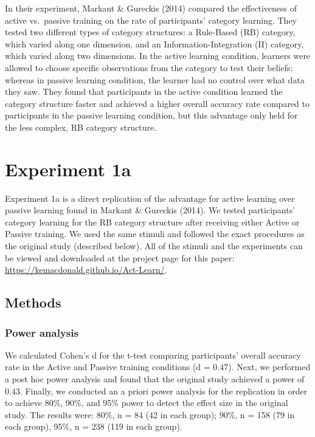 \documentclass[10pt, letterpaper]{article}
\begin{document}
In their experiment, Markant \& Gureckis (2014) compared the
effectiveness of active vs.~passive training on the rate of
participants' category learning. They tested two different types of
category structures: a Rule-Based (RB) category, which varied along one
dimension, and an Information-Integration (II) category, which varied
along two dimensions. In the active learning condition, learners were
allowed to choose specific observations from the category to test their
beliefs; whereas in passive learning condition, the learner had no
control over what data they saw. They found that participants in the
active condition learned the category structure faster and achieved a
higher overall accuracy rate compared to participants in the passive
learning condition, but this advantage only held for the less complex,
RB category structure.

\section{Experiment 1a}\label{experiment-1a}

Experiment 1a is a direct replication of the advantage for active
learning over passive learning found in Markant \& Gureckis (2014). We
tested participants' category learning for the RB category structure
after receiving either Active or Passive training. We used the same
stimuli and followed the exact procedures as the original study
(described below). All of the stimuli and the experiments can be viewed
and downloaded at the project page for this paper:
\url{https://kemacdonald.github.io/Act-Learn/}.

\subsection{Methods}\label{methods}

\subsubsection{Power analysis}\label{power-analysis}

We calculated Cohen's d for the t-test comparing participants' overall
accuracy rate in the Active and Passive training conditions (d = 0.47).
Next, we performed a post hoc power analysis and found that the original
study achieved a power of 0.43. Finally, we conducted an a priori power
analysis for the replication in order to achieve 80\%, 90\%, and 95\%
power to detect the effect size in the original study. The results were:
80\%, n = 84 (42 in each group); 90\%, n = 158 (79 in each group), 95\%,
n = 238 (119 in each group).
\end{document}
